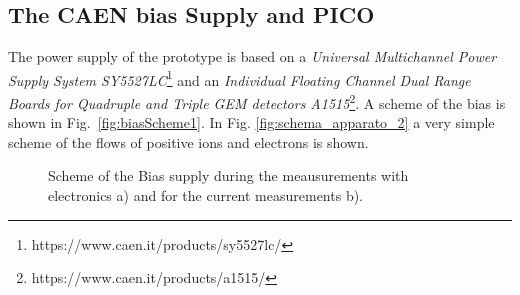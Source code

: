 \documentclass[a4paper, 11 pt]{report}
\begin{document}
\subsection{The CAEN bias Supply and PICO}
\label{sec:bias}
The power supply of the prototype is based on a {\it Universal Multichannel Power Supply System 
SY5527LC}\footnote{https://www.caen.it/products/sy5527lc/} and an {\it Individual Floating Channel 
Dual Range Boards for Quadruple and Triple GEM detectors 
A1515}\footnote{https://www.caen.it/products/a1515/}. A scheme of the bias is shown in 
Fig.~\ref{fig:biasScheme1}. In Fig. \ref{fig:schema_apparato_2} a very simple scheme of the flows 
of positive ions and electrons is shown.
\begin{figure}[!htb]
	\centering
	\caption{Scheme of the Bias supply during the meausurements with electronics a) and for the 
	 current measurements b).}
	\label{fig:induction_FULLTHGEM_other_pressure}
\end{figure}
\end{document}
